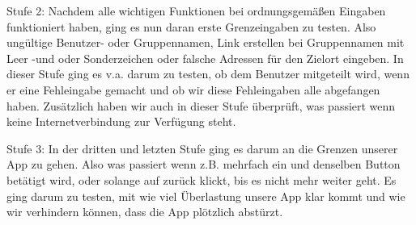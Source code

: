 Stufe 2: Nachdem alle wichtigen Funktionen bei ordnungsgemäßen Eingaben funktioniert haben, ging es nun daran erste Grenzeingaben zu testen. Also ungültige Benutzer- oder
Gruppennamen, Link erstellen bei Gruppennamen mit Leer -und oder Sonderzeichen oder falsche Adressen für den Zielort eingeben. In dieser Stufe ging es v.a. darum zu testen,
ob dem Benutzer mitgeteilt wird, wenn er eine Fehleingabe gemacht und ob wir diese Fehleingaben alle abgefangen haben. Zusätzlich haben wir auch in dieser Stufe überprüft,
was passiert wenn keine Internetverbindung zur Verfügung steht.

Stufe 3: In der dritten und letzten Stufe ging es darum an die Grenzen unserer App zu gehen. Also was passiert wenn z.B. mehrfach ein und denselben Button betätigt wird,
oder solange auf zurück klickt, bis es nicht mehr weiter geht. Es ging darum zu testen, mit wie viel Überlastung unsere App klar kommt und wie wir verhindern können, dass
die App plötzlich abstürzt.
